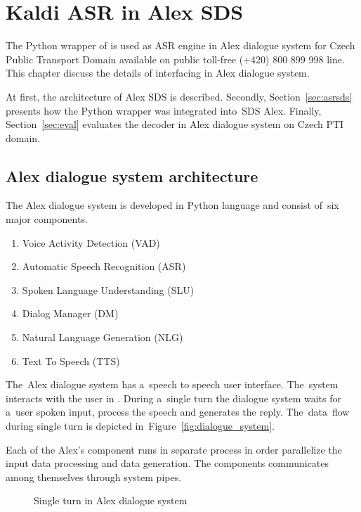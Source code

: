 \chapter{Kaldi \acs{ASR} in Alex \acs{SDS}}
\label{cha:integration}

The Python wrapper of  is used as \ac{ASR} engine in Alex dialogue system for Czech Public Transport Domain available on public toll-free (+420) 800 899 998 line.
This chapter discuss the details of interfacing  in Alex dialogue system.

At first, the architecture of Alex \acf{SDS} is described.
Secondly, Section~\ref{sec:asrsds} presents how the Python wrapper  was integrated into~\ac{SDS} Alex.
Finally, Section~\ref{sec:eval} evaluates the decoder in Alex dialogue system on Czech \ac{PTI} domain. 

\section{Alex dialogue system architecture} 
\label{sec:arch}
The Alex dialogue system is developed in Python language and consist of~six major components. 
\begin{enumerate}
    \item Voice Activity Detection (VAD)
    \item Automatic Speech Recognition (ASR) 
    \item Spoken Language Understanding (SLU)
    \item Dialog Manager (DM)
    \item Natural Language Generation (NLG)
    \item Text To Speech (TTS)
\end{enumerate}
The~Alex dialogue system has a~speech to speech user interface. 
The~system interacts with the user in . 
During a~single turn the dialogue system waits for a~user spoken input, process the speech and generates the reply.
The~data~flow during single turn is depicted in~Figure~\ref{fig:dialogue_system}.

Each of the Alex's component runs in separate process in order parallelize the input data processing and data generation.
The components communicates among themselves through system pipes.

\begin{figure}
    \begin{center}
    
    \caption{Single turn in Alex dialogue system}
    \label{fig:alex} 
    \end{center}
\end{figure}

